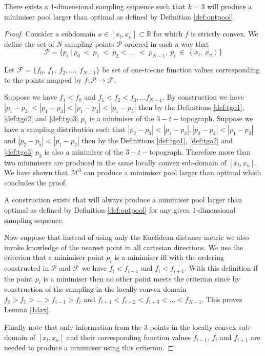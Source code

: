 \begin{theorem} \label{1d}
There exists a $1$-dimensional sampling sequence such that $k = 3$ will produce a minimiser pool larger than optimal as defined by Definition \ref{def:optpool}.
\end{theorem}

\begin{proof}
Consider a subdomain $x \in [x_l, x_u] \subset \mathbb{R}$ for which $f$ is strictly convex. We define the set of $N$ sampling points $\mathcal{P}$ ordered in such a way that $$\mathcal{P} = \{p_i~|~p_{0}~<~p_{1}~<~p_{2}<~\dots~<~p_{N-1},~p_{i}~\in~(x_l,~x_u)\}$$

Let $\mathcal{F} = \{f_{0},~f_{1},~f_{2},\dots,~f_{N-1}\}$ be set of one-to-one function values corresponding to the points mapped by $f:\mathcal{P} \rightarrow \mathcal{F}$. 

Suppose we have $f_1 < f_0$ and $f_1 < f_2 < f_3, \dots f_{N-1}$.  %
By construction we have  $|p_1 - p_2| < |p_1 - p_3| < |p_1 - p_4| < |p_1 - p_5|$ then by the Definitions \ref{def:tgo1}, \ref{def:tgo2} and \ref{def:tgo3} $p_1$ is a minimiser of the $3-t-$topograph. Suppose we have a sampling distribution such that $|p_2 - p_3| < |p_1 - p_2|, |p_2 - p_4| < |p_1 - p_2|$ and $|p_2 - p_5| < |p_1 - p_2|$ then by the Definitions \ref{def:tgo1}, \ref{def:tgo2} and \ref{def:tgo3} $p_3$ is also a minimiser of the $3-t-$topograph. Therefore more than two minimisers are produced in the same locally convex sub-domain of $[x_l, x_u]$. We have shown that $\mathcal{M}^3$ can produce a minimiser pool larger than optimal which concludes the proof.

\begin{lemma} \label{1dax}
A construction exists that will always produce a minimiser pool larger than optimal as defined by Definition \ref{def:optpool} for any given $1$-dimensional sampling sequence.
\end{lemma}

Now suppose that instead of using only the Euclidean distance metric we also invoke knowledge of the nearest point in all cartesian directions. We use the criterion that a minimiser point $p_i$ is a minimiser iff \normalfont with the ordering constructed in $\mathcal{P}$ and $\mathcal{F}$ we have $f_i < f_{i - 1}$ and $f_i < f_{i + 1}$. With this definition if the point $p_i$ is a minimiser then no other point meets the criterion since by construction of the sampling in the locally convex domain $f_{0} > f_{1} > \dots > f_{i - 1} > f_i$ and $f_{i + 1} < f_{i + 2} < f_{i + 3} < \dots < f_{N-1}$. This proves Lemma \ref{1dax}. 

Finally note that only information from the 3 points in the locally convex sub-domain of $[x_l, x_u]$ and their corresponding function values $f_{i - 1}$, $f_{i}$ and $f_{i + 1}$ are needed to produce a minimiser using this criterion.
\end{proof}

